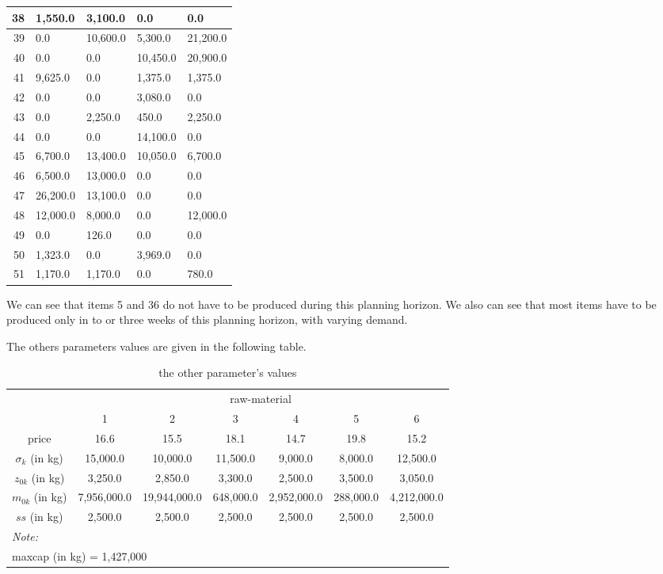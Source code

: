 \documentclass[preprint, 3p,
authoryear]{elsarticle} %
\begin{document}
\begin{table}[!h]
\begin{tabular}[t]{r|l|l|l|l}
\hline
38 & 1,550.0 & 3,100.0 & 0.0 & 0.0\\
\hline
39 & 0.0 & 10,600.0 & 5,300.0 & 21,200.0\\
\hline
40 & 0.0 & 0.0 & 10,450.0 & 20,900.0\\
\hline
41 & 9,625.0 & 0.0 & 1,375.0 & 1,375.0\\
\hline
42 & 0.0 & 0.0 & 3,080.0 & 0.0\\
\hline
43 & 0.0 & 2,250.0 & 450.0 & 2,250.0\\
\hline
44 & 0.0 & 0.0 & 14,100.0 & 0.0\\
\hline
45 & 6,700.0 & 13,400.0 & 10,050.0 & 6,700.0\\
\hline
46 & 6,500.0 & 13,000.0 & 0.0 & 0.0\\
\hline
47 & 26,200.0 & 13,100.0 & 0.0 & 0.0\\
\hline
48 & 12,000.0 & 8,000.0 & 0.0 & 12,000.0\\
\hline
49 & 0.0 & 126.0 & 0.0 & 0.0\\
\hline
50 & 1,323.0 & 0.0 & 3,969.0 & 0.0\\
\hline
51 & 1,170.0 & 1,170.0 & 0.0 & 780.0\\
\hline
\end{tabular}
\end{table}

We can see that items 5 and 36 do not have to be produced during this
planning horizon. We also can see that most items have to be produced
only in to or three weeks of this planning horizon, with varying demand.

The others parameters values are given in the following table.

\newpage

\begin{table}[!h]

\caption{\label{tab:unnamed-chunk-8}the other parameter's values}
\centering
\begin{tabular}[t]{ccccccc}
\toprule
\multicolumn{1}{c}{ } & \multicolumn{6}{c}{raw-material} \\
\cmidrule(l{3pt}r{3pt}){2-7}
  & 1 & 2 & 3 & 4 & 5 & 6\\
\midrule
price & 16.6 & 15.5 & 18.1 & 14.7 & 19.8 & 15.2\\
$\sigma_k$ (in kg) & 15,000.0 & 10,000.0 & 11,500.0 & 9,000.0 & 8,000.0 & 12,500.0\\
$z_{0k}$ (in kg) & 3,250.0 & 2,850.0 & 3,300.0 & 2,500.0 & 3,500.0 & 3,050.0\\
$m_{0k}$ (in kg) & 7,956,000.0 & 19,944,000.0 & 648,000.0 & 2,952,000.0 & 288,000.0 & 4,212,000.0\\
$ss$ (in kg) & 2,500.0 & 2,500.0 & 2,500.0 & 2,500.0 & 2,500.0 & 2,500.0\\
\bottomrule
\multicolumn{7}{l}{\rule{0pt}{1em}\textit{Note: }}\\
\multicolumn{7}{l}{\rule{0pt}{1em}maxcap (in kg) = 1,427,000}\\
\end{tabular}
\end{table}
\end{document}
